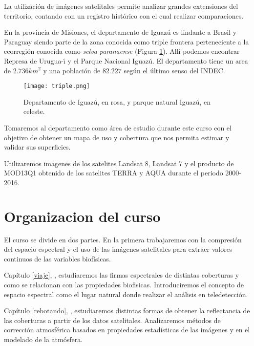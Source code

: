 \label{sec:intro}

La utilización de imágenes satelitales permite analizar grandes extensiones del
territorio, contando con un registro histórico con el cual realizar
comparaciones.

En la provincia de Misiones, el departamento de Iguaz\'u es lindante a Brasil y
Paraguay siendo parte de la zona conocida como triple frontera
perteneciente a la ecorregi\'on conocida como \emph{selva paranaense} (Figura \ref{parque}). All\'i podemos encontrar Represa de Urugua-\'{\i} y el Parque Nacional
Iguaz\'u. El departamento tiene un area de $2.736 km^2$ y una poblaci\'on de
$82.227$ seg\'un el \'ultimo senso del INDEC.

\begin{figure}[h!]
  \centering
  \texttt{[image: triple.png]}
  \caption{Departamento de Iguaz\'u, en rosa, y parque natural Iguaz\'u, en celeste.}
  \label{parque}
\end{figure}

Tomaremos al departamento como \'area de estudio durante este curso
con el objetivo de obtener un mapa de uso y cobertura que nos
permita estimar y validar sus superficies.

Utilizaremos imagenes de los satelites Landsat 8, Landsat 7 y
el producto de MOD13Q1 obtenido de los satelites TERRA y AQUA durante
el periodo 2000-2016.

\section{Organizacion del curso}

El curso se divide en dos partes. En la primera trabajaremos con la compresi\'on
del espacio espectral y el uso de las im\'agenes satelitales para extraer valores continuos de las variables biof\'isicas.

Cap\'itulo  \ref{viaje}, , estudiaremos las firmas espectrales de
distintas coberturas y como se relacionan con las propiedades biofisicas.
Introduciremos el concepto de espacio espectral como el
lugar natural donde realizar el an\'alisis en teledetecci\'on.

Cap\'itulo  \ref{rebotando}, , estudiaremos distintas
formas de obtener la reflectancia de las coberturas a partir de los datos satelitales. Analizaremos m\'etodos de correcci\'on atmosf\'erica basados en propiedades estad\'isticas de las im\'agenes y en el modelado de la atm\'osfera.

